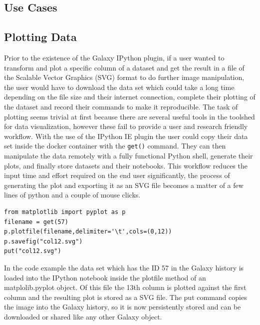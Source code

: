 \documentclass{bioinfo}
\begin{document}
\begin{methods}
\section{Use Cases}
\subsection{Plotting Data}
Prior to the existence of the Galaxy IPython plugin, if a user wanted to transform and plot a specific column of a dataset and
get the result in a file of the Scalable Vector Graphics (SVG) format to do further image manipulation,
the user would have to download the data set which could take a long time depending on the file size and their internet
connection, complete their plotting of the dataset and record their commands to make it reproducible.
The task of plotting seems trivial at first because there are several useful tools in the toolshed for data visualization,
however these fail to provide a user and research friendly workflow. With the use of the IPython IE plugin the user
could copy their data set inside the docker container with the \texttt{get()} command. They can then manipulate the
data remotely with a fully functional Python shell, generate their plots, and finally store datasets and their notebooks.
This workflow reduces the input time and effort required on the end user significantly, the process of generating the plot
and exporting it as an SVG file becomes a matter of a few lines of python and a couple of mouse clicks.

\begin{lstlisting}[frame=single]
from matplotlib import pyplot as p
filename = get(57)
p.plotfile(filename,delimiter='\t',cols=(0,12))
p.savefig("col12.svg")
put("col12.svg")
\end{lstlisting}
In the code example the data set which has the ID 57 in the Galaxy history is loaded into the IPython notebook inside the
plotfile method of an matplolib.pyplot object. Of this file the 13th column is plotted against the first column and the
resulting plot is stored as a SVG file. The put command copies the image into the Galaxy history, so it is now persistently
stored and can be downloaded or shared like any other Galaxy object.


\end{methods}
\end{document}
